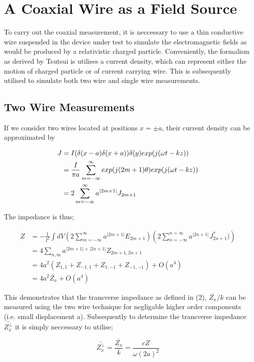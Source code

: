 \section{A Coaxial Wire as a Field Source}

To carry out the coaxial measurement, it is neccessary to use a thin conductive wire suspended in the device under test to simulate the electromagnetic fields as would be produced by a relativistic charged particle. Conveniently, the formalism as derived by Tsutsui is utilises a current density, which can represent either the motion of charged particle or of current carrying wire. This is subsequently utilised to simulate both two wire and single wire measurements.

\subsection{Two Wire Measurements}

If we consider two wires located at positions $x=\pm a$, their current density can be approximated by

\begin{align*}
J & = I(\delta(x-a)\-\delta(x+a))\delta(y)exp(j(\omega{}t - kz))\\
  & = \frac{I}{\pi{}a}\sum^{\infty}_{m=-\infty}exp(j(2m+1)\theta)exp(j(\omega{}t-kz))\\
  & = 2 \sum^{\infty}_{m=-\infty}a^{|2m+1|}J_{2m+1}
\end{align*}

The impedance is thus;

\begin{align}
Z & = -\frac{1}{I^{2}}\int dV \left( 2\sum^{\infty}_{m=-\infty}a^{|2m+1|}E_{2m+1}\right) \left( 2\sum^{n=\infty}_{n=-\infty}a^{|2n+1|}J^{*}_{2n+1}) \right)\\
& =  4\sum_{n,m} a^{|2m+1| + |2n+1|}Z_{2m+1,2n+1} \\
& =  4a^{2}(Z_{1,1} + Z_{-1,1} + Z_{1,-1} + Z_{-1,-1}) + O(a^{4})\\
& =  4a^{2}\bar{Z_{x}}+O(a^{4})
\end{align}

This demonstrates that the transverse impedance as defined in (2), $\bar{Z_{x}}/k$ can be measured using the two wire technique for negligable higher order components (i.e. small displacement a). Subsequently to determine the transverse impedance $\bar{Z^{\perp}_{x}}$ it is simply neccessary to utilise;

\begin{equation}
\bar{Z^{\perp}_{x}} = \frac{\bar{Z_{x}}}{k} = \frac{cZ}{\omega(2a)^{2}}
\end{equation}

